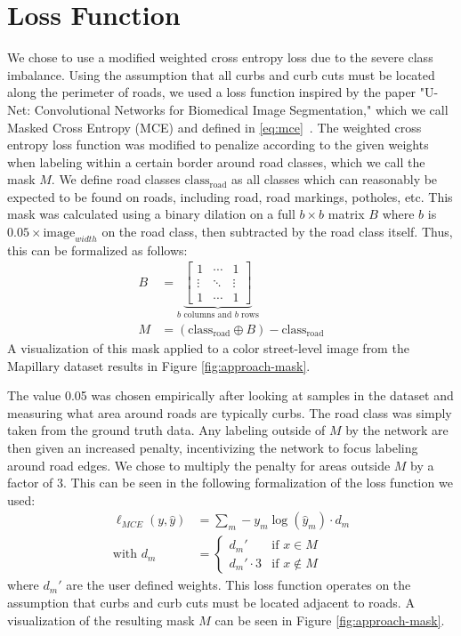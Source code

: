 \section{Loss Function}\label{section:approach-lossfunction}
We chose to use a modified weighted cross entropy loss due to the severe class imbalance.
Using the assumption that all curbs and curb cuts must be located along the perimeter of roads, we used a loss function inspired by the paper "U-Net: Convolutional Networks for Biomedical Image Segmentation," which we call Masked Cross Entropy (MCE) and defined in \eqref{eq:mce}~\cite{unet}.
The weighted cross entropy loss function was modified to penalize according to the given weights when labeling within a certain border around road classes, which we call the mask $M$.
We define road classes $\text{class}_{\text{road}}$ as all classes which can reasonably be expected to be found on roads, including road, road markings, potholes, etc.
This mask was calculated using a binary dilation on a full $b \times b$ matrix $B$ where $b$ is $0.05 \times \text{image}_{width}$ on the road class, then subtracted by the road class itself.
Thus, this can be formalized as follows:
\begin{align}
	B &= \underbrace{
			\begin{bmatrix}
				1  & \cdots & 1\\ 
				\vdots &  \ddots & \vdots\\ 
				1 &  \cdots & 1
				\end{bmatrix}}_{b \text{ columns and } b \text{ rows}} \\
	M &= \left(\text{class}_{\text{road}} \oplus B\right) - \text{class}_{\text{road}}
\end{align}
A visualization of this mask applied to a color street-level image from the Mapillary dataset results in Figure \ref{fig:approach-mask}.


The value 0.05 was chosen empirically after looking at samples in the dataset and measuring what area around roads are typically curbs.
The road class was simply taken from the ground truth data.
Any labeling outside of $M$ by the network are then given an increased penalty, incentivizing the network to focus labeling around road edges.
We chose to multiply the penalty for areas outside $M$ by a factor of 3.
This can be seen in the following formalization of the loss function we used:
\begin{align}\label{eq:mce}
	\ell_{MCE}(y, \hat{y}) &=\sum_{m}-y_m\log(\hat{y}_m) \cdot d_m\\
	\text{with } d_m &= 
	\begin{cases}
	d_m' & \text{if } x \in M\\
	d_m' \cdot 3 & \text{if } x \notin M
	\end{cases}
\end{align}
where $d_m'$ are the user defined weights. 
This loss function operates on the assumption that curbs and curb cuts must be located adjacent to roads.
A visualization of the resulting mask $M$ can be seen in Figure \ref{fig:approach-mask}.
